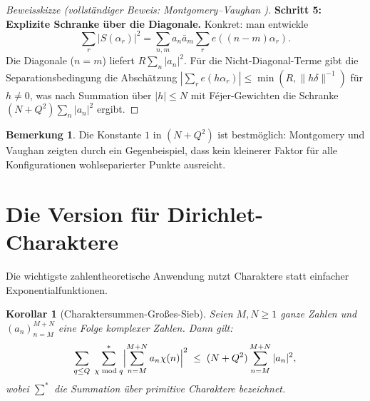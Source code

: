 \documentclass[12pt,a4paper]{amsart}
\newtheorem{korollar}[theorem]{Korollar}
\theoremstyle{definition}
\newtheorem{bemerkung}[theorem]{Bemerkung}
\newcommand{\eexp}[1]{e\!\left(#1\right)}
\begin{document}
\begin{proof}[Beweisskizze (vollständiger Beweis: Montgomery--Vaughan \cite{MV1973})]
  \textbf{Schritt 5: Explizite Schranke über die Diagonale.}
  Konkret: man entwickle
  \[
    \sum_{r}|S(\alpha_r)|^{2}
    = \sum_{n,m} a_n\bar{a}_m \sum_r \eexp{(n-m)\alpha_r}.
  \]
  Die Diagonale ($n=m$) liefert $R\sum_n|a_n|^2$.  Für die Nicht-Diagonal-Terme
  gibt die Separationsbedingung die Abschätzung
  $|\sum_r \eexp{h\alpha_r}| \leq \min(R, \|h\delta\|^{-1})$
  für $h \neq 0$, was nach Summation über $|h| \leq N$ mit Féjer-Gewichten
  die Schranke $(N + Q^2)\sum_n |a_n|^2$ ergibt.  \qedhere
\end{proof}

\begin{bemerkung}
  Die Konstante $1$ in $(N + Q^2)$ ist bestmöglich: Montgomery und Vaughan
  zeigten durch ein Gegenbeispiel, dass kein kleinerer Faktor für alle
  Konfigurationen wohlseparierter Punkte ausreicht.
\end{bemerkung}

\section{Die Version für Dirichlet-Charaktere}

Die wichtigste zahlentheoretische Anwendung nutzt Charaktere statt einfacher
Exponentialfunktionen.

\begin{korollar}[Charaktersummen-Großes-Sieb]\label{kor:charakter_sieb}
  Seien $M, N \geq 1$ ganze Zahlen und $(a_n)_{n=M}^{M+N}$ eine Folge
  komplexer Zahlen.  Dann gilt:
  \[
    \sum_{q \leq Q}\;\sum_{\chi \bmod q}^{*}
    \Bigl|\sum_{n=M}^{M+N} a_n\chi(n)\Bigr|^{2}
    \;\leq\;
    (N + Q^{2})\sum_{n=M}^{M+N}|a_n|^{2},
  \]
  wobei $\sum^*$ die Summation über primitive Charaktere bezeichnet.
\end{korollar}
\end{document}

